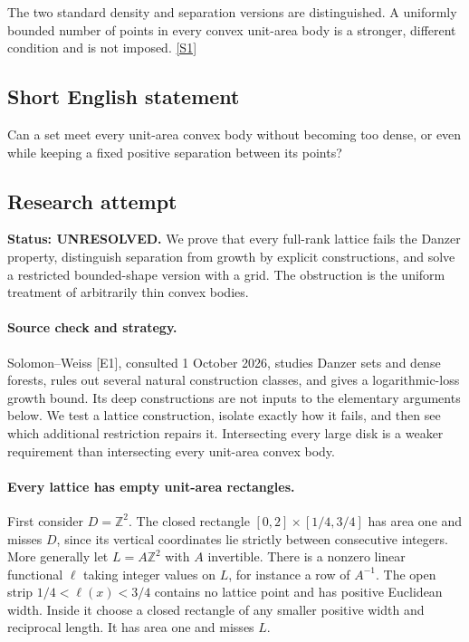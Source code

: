 \documentclass[11pt,a4paper]{article}
\newcommand{\sref}[2]{\hyperlink{source:#1:#2}{[S#2]}}
\begin{document}
The two standard density and separation versions are distinguished. A uniformly bounded number of points in every convex unit-area body is a stronger, different condition and is not imposed. \sref{statement}{1}

\subsection{Short English statement}

Can a set meet every unit-area convex body without becoming too dense, or even while keeping a fixed positive separation between its points?

\subsection{Research attempt}
\textbf{Status: UNRESOLVED.} We prove that every full-rank lattice fails the Danzer property, distinguish separation from growth by explicit constructions, and solve a restricted bounded-shape version with a grid. The obstruction is the uniform treatment of arbitrarily thin convex bodies.

\paragraph{Source check and strategy.}
Solomon--Weiss [E1], consulted 1 October 2026, studies Danzer sets and dense forests, rules out several natural construction classes, and gives a logarithmic-loss growth bound. Its deep constructions are not inputs to the elementary arguments below. We test a lattice construction, isolate exactly how it fails, and then see which additional restriction repairs it. Intersecting every large disk is a weaker requirement than intersecting every unit-area convex body.

\paragraph{Every lattice has empty unit-area rectangles.}
First consider $D=\mathbb Z^2$. The closed rectangle $[0,2]\times[1/4,3/4]$ has area one and misses $D$, since its vertical coordinates lie strictly between consecutive integers. More generally let $L=A\mathbb Z^2$ with $A$ invertible. There is a nonzero linear functional $\ell$ taking integer values on $L$, for instance a row of $A^{-1}$. The open strip $1/4<\ell(x)<3/4$ contains no lattice point and has positive Euclidean width. Inside it choose a closed rectangle of any smaller positive width and reciprocal length. It has area one and misses $L$.
\end{document}
